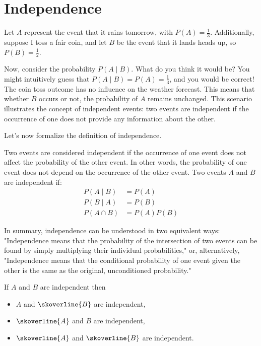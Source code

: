 \section{Independence}
Let $A$ represent the event that it rains tomorrow, with $P(A)=\frac{1}{3}$. Additionally, suppose I toss a fair coin, and let $B$ be the event that it lands heads up, so $P(B)=\frac{1}{2}$.

Now, consider the probability $P(A \mid B)$. What do you think it would be? You might intuitively guess that $P(A \mid B)=P(A)=\frac{1}{3}$, and you would be correct! The coin toss outcome has no influence on the weather forecast. This means that whether $B$ occurs or not, the probability of $A$ remains unchanged. This scenario illustrates the concept of independent events: two events are independent if the occurrence of one does not provide any information about the other.

Let's now formalize the definition of independence.
\newpage

\begin{definition}[Independence]
    Two events are considered independent if the occurrence of one event does not affect the probability of the other event. In other words, the probability of one event does not depend on the occurrence of the other event. Two events \( A \) and \( B \) are independent if:
    \begin{align*}
        P(A \mid B) &= P(A) \\
        P(B \mid A) &= P(B) \\
        P(A \cap B) &= P(A) P(B)
    \end{align*}
\end{definition}

In summary, independence can be understood in two equivalent ways: "Independence means that the probability of the intersection of two events can be found by simply multiplying their individual probabilities," or, alternatively, "Independence means that the conditional probability of one event given the other is the same as the original, unconditioned probability."

\begin{lemma}
If $A$ and $B$ are independent then
\begin{itemize}
    \item $A$ and $\skoverline{B}$ are independent,
    \item $\skoverline{A}$ and $B$ are independent,
    \item $\skoverline{A}$ and $\skoverline{B}$ are independent.
\end{itemize}
\end{lemma}

